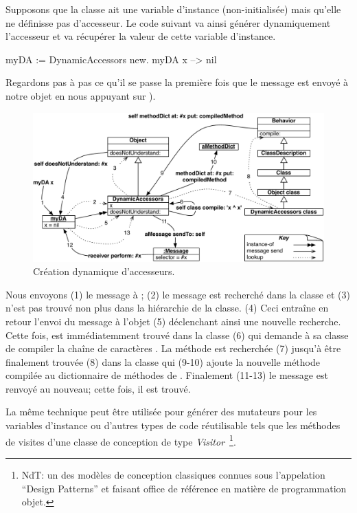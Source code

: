 \documentclass[a4paper,10pt,twoside]{book}
\begin{document}
Supposons que la classe  ait une variable d'instance
(non-initialisée)  mais qu'elle ne définisse pas d'accesseur.
Le code suivant va ainsi générer dynamiquement l'accesseur et va récupérer la valeur de cette variable d'instance.
\begin{code}{}
myDA := DynamicAccessors new.
myDA x --> nil
\end{code}

Regardons pas à pas ce qu'il se passe la première fois que le message 
 est envoyé à notre objet en nous appuyant sur ).

\begin{figure}[ht]\centering
	\includegraphics[width=\linewidth]{DynamicAccessors}
	\caption{Création dynamique d'accesseurs.}
\end{figure}

Nous envoyons (1) le message  à ; (2) le message est recherché dans la classe et (3) n'est pas trouvé non plus dans la hiérarchie de la classe. (4) Ceci entraîne en retour l'envoi du message  à l'objet (5) déclenchant ainsi une nouvelle recherche. Cette fois,  est immédiatemment trouvé dans la classe  (6) qui demande à sa classe de compiler la chaîne de caractères . La méthode  est recherchée (7) jusqu'à être finalement trouvée (8) dans la classe  qui (9-10) ajoute la nouvelle méthode compilée au dictionnaire de méthodes de . Finalement (11-13) le message est renvoyé au nouveau; cette fois, il est trouvé.

La même technique peut être utilisée pour générer des mutateurs pour les variables d'instance ou d'autres types de code réutilisable tels que les méthodes de visites d'une classe de conception de type \emph{Visitor}~\footnote{NdT: un des modèles de conception classiques connues sous l'appelation ``Design Patterns'' et faisant office de référence en matière de programmation objet.}.
\end{document}
